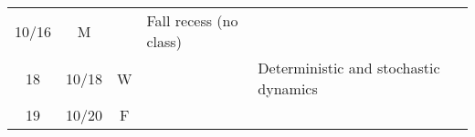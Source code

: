 \documentclass[]{article}
\begin{document}
\begin{longtable}[]{@{}ccclll@{}}
\begin{minipage}[t]{0.13\columnwidth}
10/16\strut
\end{minipage} & \begin{minipage}[t]{0.08\columnwidth}\centering\strut
M\strut
\end{minipage} & \begin{minipage}[t]{0.07\columnwidth}\centering\strut
\strut
\end{minipage} & \begin{minipage}[t]{0.10\columnwidth}\raggedright\strut
Fall recess (no class)\strut
\end{minipage} & \begin{minipage}[t]{0.12\columnwidth}\raggedright\strut
\strut
\end{minipage} & \begin{minipage}[t]{0.12\columnwidth}\raggedright\strut
\strut
\end{minipage}\tabularnewline
\begin{minipage}[t]{0.13\columnwidth}\centering\strut
18\strut
\end{minipage} & \begin{minipage}[t]{0.08\columnwidth}\centering\strut
10/18\strut
\end{minipage} & \begin{minipage}[t]{0.07\columnwidth}\centering\strut
W\strut
\end{minipage} & \begin{minipage}[t]{0.10\columnwidth}\raggedright\strut
\strut
\end{minipage} & \begin{minipage}[t]{0.12\columnwidth}\raggedright\strut
Deterministic and stochastic dynamics\strut
\end{minipage} & \begin{minipage}[t]{0.12\columnwidth}\raggedright\strut
\strut
\end{minipage}\tabularnewline
\begin{minipage}[t]{0.13\columnwidth}\centering\strut
19\strut
\end{minipage} & \begin{minipage}[t]{0.08\columnwidth}\centering\strut
10/20\strut
\end{minipage} & \begin{minipage}[t]{0.07\columnwidth}\centering\strut
F\strut
\end{minipage} & \begin{minipage}[t]{0.10\columnwidth}\raggedright\strut
\strut
\end{minipage} & \begin{minipage}[t]{0.12\columnwidth}\raggedright\strut

\end{minipage}
\end{longtable}
\end{document}
